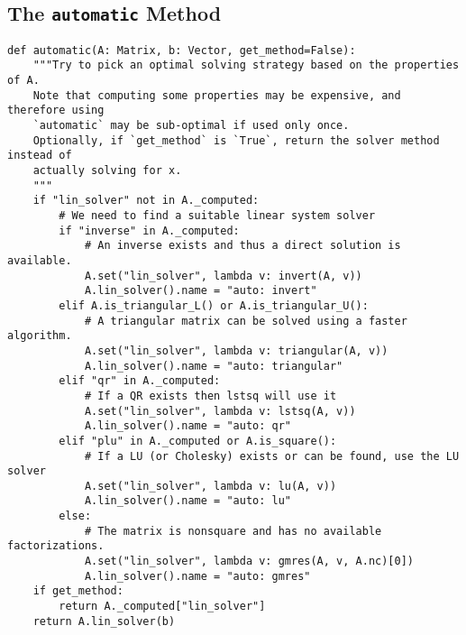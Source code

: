 \documentclass[12pt,a4paper]{article}
\newcommand{\ct}[1]{\texttt{#1}}
\begin{document}
\subsection{The \ct{automatic} Method}
\label{code:automatic}
\begin{verbatim}
def automatic(A: Matrix, b: Vector, get_method=False):
    """Try to pick an optimal solving strategy based on the properties of A.
    Note that computing some properties may be expensive, and therefore using
    `automatic` may be sub-optimal if used only once.
    Optionally, if `get_method` is `True`, return the solver method instead of
    actually solving for x.
    """
    if "lin_solver" not in A._computed:
        # We need to find a suitable linear system solver
        if "inverse" in A._computed:
            # An inverse exists and thus a direct solution is available.
            A.set("lin_solver", lambda v: invert(A, v))
            A.lin_solver().name = "auto: invert"
        elif A.is_triangular_L() or A.is_triangular_U():
            # A triangular matrix can be solved using a faster algorithm.
            A.set("lin_solver", lambda v: triangular(A, v))
            A.lin_solver().name = "auto: triangular"
        elif "qr" in A._computed:
            # If a QR exists then lstsq will use it
            A.set("lin_solver", lambda v: lstsq(A, v))
            A.lin_solver().name = "auto: qr"
        elif "plu" in A._computed or A.is_square():
            # If a LU (or Cholesky) exists or can be found, use the LU solver
            A.set("lin_solver", lambda v: lu(A, v))
            A.lin_solver().name = "auto: lu"
        else:
            # The matrix is nonsquare and has no available factorizations.
            A.set("lin_solver", lambda v: gmres(A, v, A.nc)[0])
            A.lin_solver().name = "auto: gmres"
    if get_method:
        return A._computed["lin_solver"]
    return A.lin_solver(b)
\end{verbatim}
\end{document}
